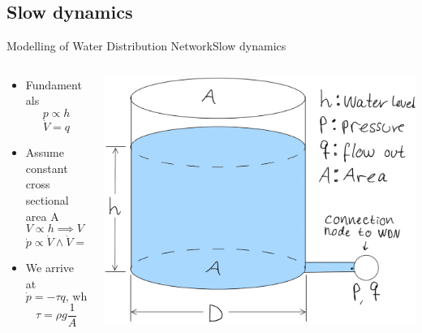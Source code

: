 \subsection{Slow dynamics}

\begin{frame}{Modelling of Water Distribution Network}{Slow dynamics}
	\begin{columns}
		\begin{column}{.5\textwidth}
			\begin{itemize}
				\item Fundamentals
				\begin{equation*}
					p \propto h 
				\end{equation*}
				\begin{equation*}
					\dot{V} = q
				\end{equation*}
				\item Assume constant cross sectional area A
				\begin{equation*}
					V \propto h \implies V \propto p 
				\end{equation*}
				\begin{equation*}
					\dot{p} \propto \dot{V} \wedge \dot{V} = q \implies \dot{p} \propto q
				\end{equation*}
				\item We arrive at
				\begin{equation*}
					\dot{p} = -\tau q \text{,  where}
				\end{equation*}	
				\begin{equation*}
					\tau = \rho g \frac{1}{A}
				\end{equation*}	
			\end{itemize}
		\end{column}
		\begin{column}{.5\textwidth}\raggedleft
			\includegraphics[width=1\linewidth]{Topics/SlowDynamicsLinearisation/Graphics/Tank_sketch.png}
		\end{column}
	\end{columns}
\end{frame}

